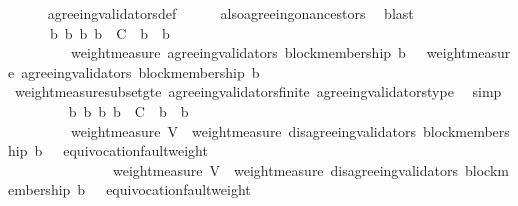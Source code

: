 \begin{isabellebody}
\ \ \ \ \isamarkupfalse%
\ agreeing{\isacharunderscore}validators{\isacharunderscore}def\isanewline
\ \ \ \ \isamarkupfalse%
\ also{\isacharunderscore}agreeing{\isacharunderscore}on{\isacharunderscore}ancestors\ \isamarkupfalse%
\ blast\isanewline
\ \ \isamarkupfalse%
\ {\isachardoublequoteopen}{\isasymforall}\ {\isasymsigma}\ {\isasymin}\ {\isasymSigma}{\isachardot}\ {\isasymforall}\ b\ b{\isacharprime}{\isachardot}\ {\isacharbraceleft}b{\isacharcomma}\ b{\isacharprime}{\isacharbraceright}\ {\isasymsubseteq}\ C\ {\isasymand}\ b{\isacharprime}\ {\isasymdownharpoonright}\ b\ \isanewline
\ \ \ \ \ \ \ \ {\isasymlongrightarrow}\ weight{\isacharunderscore}measure\ {\isacharparenleft}agreeing{\isacharunderscore}validators\ {\isacharparenleft}block{\isacharunderscore}membership\ b{\isacharprime}{\isacharcomma}\ {\isasymsigma}{\isacharparenright}{\isacharparenright}\ {\isasymge}\ weight{\isacharunderscore}measure\ {\isacharparenleft}agreeing{\isacharunderscore}validators\ {\isacharparenleft}block{\isacharunderscore}membership\ b{\isacharcomma}\ {\isasymsigma}{\isacharparenright}{\isacharparenright}{\isachardoublequoteclose}\isanewline
\ \ \ \ \isamarkupfalse%
\ weight{\isacharunderscore}measure{\isacharunderscore}subset{\isacharunderscore}gte\ agreeing{\isacharunderscore}validators{\isacharunderscore}finite\ agreeing{\isacharunderscore}validators{\isacharunderscore}type\ \isamarkupfalse%
\ simp\isanewline
\ \ \isamarkupfalse%
\ {\isachardoublequoteopen}{\isasymforall}\ {\isasymsigma}\ {\isasymin}\ {\isasymSigma}{\isachardot}\ {\isasymforall}\ b\ b{\isacharprime}{\isachardot}\ {\isacharbraceleft}b{\isacharcomma}\ b{\isacharprime}{\isacharbraceright}\ {\isasymsubseteq}\ C\ {\isasymand}\ b{\isacharprime}\ {\isasymdownharpoonright}\ b\ \isanewline
\ \ \ \ \ \ \ \ {\isasymlongrightarrow}\ weight{\isacharunderscore}measure\ V\ {\isacharminus}\ weight{\isacharunderscore}measure\ {\isacharparenleft}disagreeing{\isacharunderscore}validators\ {\isacharparenleft}block{\isacharunderscore}membership\ b{\isacharprime}{\isacharcomma}\ {\isasymsigma}{\isacharparenright}{\isacharparenright}\ {\isacharminus}\ equivocation{\isacharunderscore}fault{\isacharunderscore}weight\ {\isasymsigma}\ \isanewline
\ \ \ \ \ \ \ \ \ \ \ \ \ \ {\isasymge}\ weight{\isacharunderscore}measure\ V\ {\isacharminus}\ weight{\isacharunderscore}measure\ {\isacharparenleft}disagreeing{\isacharunderscore}validators\ {\isacharparenleft}block{\isacharunderscore}membership\ b{\isacharcomma}\ {\isasymsigma}{\isacharparenright}{\isacharparenright}\ {\isacharminus}\ equivocation{\isacharunderscore}fault{\isacharunderscore}weight\ {\isasymsigma}{\isachardoublequoteclose}\isanewline

\end{isabellebody}
